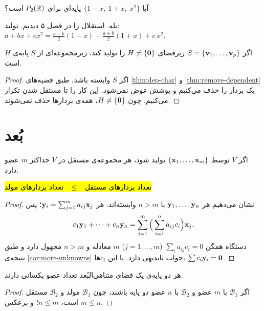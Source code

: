 \begin{example}
آیا $\{1-x,\ 1+x,\ x^2\}$ پایه‌ای برای $P_2(\mathbb{R})$ است؟
\end{example}
\begin{solution}
بله. استقلال را در فصل ۵ دیدیم. تولید:
$a+bx+cx^2=\frac{a-b}{2}(1-x)+\frac{a+b}{2}(1+x)+c\,x^2$.
\end{solution}

\begin{theorem}\label{thm:spanning-set}
اگر $S=\{\mathbf{v}_1,\dots,\mathbf{v}_p\}$ زیرفضای $H\neq\{\mathbf{0}\}$ را تولید کند، زیرمجموعه‌ای از $S$ پایه‌ی $H$ است.
\end{theorem}
\begin{proof}
اگر $S$ وابسته باشد، طبق قضیه‌های \ref{thm:dep-char} و \ref{thm:remove-dependent} یک بردار را حذف می‌کنیم و پوشش عوض نمی‌شود. این کار را تا مستقل شدن تکرار می‌کنیم. چون $H\neq\{\mathbf{0}\}$، همه‌ی بردارها حذف نمی‌شوند.
\end{proof}

\section{بُعد}

\begin{theorem}\label{thm:indep-le-span}
اگر $V$ توسط $\{\mathbf{x}_1,\dots,\mathbf{x}_m\}$ تولید شود، هر مجموعه‌ی مستقل در $V$ حداکثر $m$ عضو دارد.
\begin{center}
\hl{تعداد بردارهای مستقل \ $\le$ \ تعداد بردارهای مولد}
\end{center}
\end{theorem}
\begin{proof}
نشان می‌دهیم هر $\mathbf{y}_1,\dots,\mathbf{y}_n$ با $n>m$ وابسته‌اند. هر $\mathbf{y}_i=\sum_{j=1}^m a_{ij}\mathbf{x}_j$؛ پس
\[
c_1\mathbf{y}_1+\dots+c_n\mathbf{y}_n=\sum_{j=1}^m\Big(\sum_{i=1}^n a_{ij}c_i\Big)\mathbf{x}_j .
\]
دستگاه همگن  $\sum_i a_{ij}c_i=0$ ($j=1,\dots,m$) $m$ معادله و $n>m$ مجهول دارد و طبق نتیجه‌ی \ref{cor:more-unknowns} جواب نابدیهی دارد. با این $c_i$ها، $\sum c_i\mathbf{y}_i=\mathbf{0}$.
\end{proof}

\begin{theorem}\label{thm:bases-same-size}
هر دو پایه‌ی یک فضای متناهی‌البُعد تعداد عضو یکسانی دارند.
\end{theorem}
\begin{proof}
اگر $\mathcal{B}_1$ با $m$ عضو و $\mathcal{B}_2$ با $n$ عضو دو پایه باشند، چون $\mathcal{B}_1$ مولد و $\mathcal{B}_2$ مستقل است، $n\le m$؛ و برعکس $m\le n$.
\end{proof}

